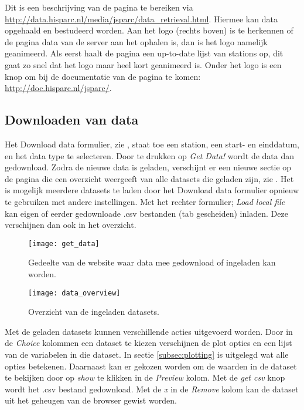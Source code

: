 Dit is een beschrijving van de pagina te bereiken via
\url{http://data.hisparc.nl/media/jsparc/data_retrieval.html}. Hiermee
kan data opgehaald en bestudeerd worden. Aan het \hisparc logo (rechts
boven) is te herkennen of de pagina data van de \hisparc server aan het
ophalen is, dan is het logo namelijk geanimeerd. Als eerst haalt de
pagina een up-to-date lijst van \hisparc stations op, dit gaat zo snel
dat het logo maar heel kort geanimeerd is. Onder het logo is een knop om bij 
de documentatie van de pagina te komen: \url{http://doc.hisparc.nl/jsparc/}.


\subsection{Downloaden van data}

Het Download data formulier, zie , staat toe
een \hisparc station, een start- en einddatum, en het data type te
selecteren. Door te drukken op \emph{Get Data!} wordt de data dan
gedownload. Zodra de nieuwe data is geladen, verschijnt er een nieuwe
sectie op de pagina die een overzicht weergeeft van alle datasets die
geladen zijn, zie . Het is mogelijk meerdere
datasets te laden door het Download data formulier opnieuw te gebruiken
met andere instellingen. Met het rechter formulier; \emph{Load local
file} kan eigen of eerder gedownloade .csv bestanden (tab
gescheiden) inladen. Deze verschijnen dan ook in het overzicht.

\begin{figure}
    \centering
    \texttt{[image: get\_data]}
    \caption{Gedeelte van de website waar data mee gedownload of
             ingeladen kan worden.}
    \label{fig:get_data}
\end{figure}

\begin{figure}
    \centering
    \texttt{[image: data\_overview]}
    \caption{Overzicht van de ingeladen datasets.}
    \label{fig:data_overview}
\end{figure}

Met de geladen datasets kunnen verschillende acties uitgevoerd worden.
Door in de \emph{Choice} kolommen een dataset te kiezen verschijnen de
plot opties en een lijst van de variabelen in die dataset. In sectie
\ref{subsec:plotting} is uitgelegd wat alle opties betekenen. Daarnaast
kan er gekozen worden om de waarden in de dataset te bekijken door op
\emph{show} te klikken in de \emph{Preview} kolom. Met de \emph{get csv}
knop wordt het .csv bestand gedownload. Met de \emph{x} in de
\emph{Remove} kolom kan de dataset uit het geheugen van de browser
gewist worden.



